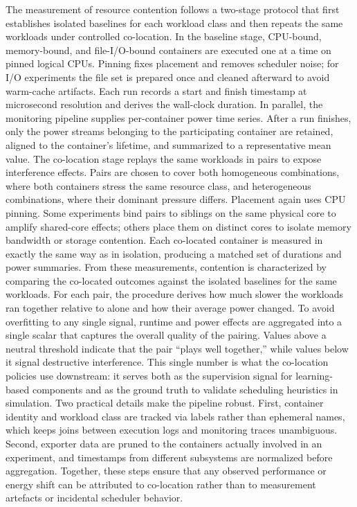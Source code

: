 The measurement of resource contention follows a two-stage protocol that first establishes isolated baselines for each workload class and then repeats the same workloads under controlled co-location. In the baseline stage, CPU-bound, memory-bound, and file-I/O-bound containers are executed one at a time on pinned logical CPUs. Pinning fixes placement and removes scheduler noise; for I/O experiments the file set is prepared once and cleaned afterward to avoid warm-cache artifacts. Each run records a start and finish timestamp at microsecond resolution and derives the wall-clock duration. In parallel, the monitoring pipeline supplies per-container power time series. After a run finishes, only the power streams belonging to the participating container are retained, aligned to the container’s lifetime, and summarized to a representative mean value.
The co-location stage replays the same workloads in pairs to expose interference effects. Pairs are chosen to cover both homogeneous combinations, where both containers stress the same resource class, and heterogeneous combinations, where their dominant pressure differs. Placement again uses CPU pinning. Some experiments bind pairs to siblings on the same physical core to amplify shared-core effects; others place them on distinct cores to isolate memory bandwidth or storage contention. Each co-located container is measured in exactly the same way as in isolation, producing a matched set of durations and power summaries.
From these measurements, contention is characterized by comparing the co-located outcomes against the isolated baselines for the same workloads. For each pair, the procedure derives how much slower the workloads ran together relative to alone and how their average power changed. To avoid overfitting to any single signal, runtime and power effects are aggregated into a single scalar that captures the overall quality of the pairing. Values above a neutral threshold indicate that the pair “plays well together,” while values below it signal destructive interference. This single number is what the co-location policies use downstream: it serves both as the supervision signal for learning-based components and as the ground truth to validate scheduling heuristics in simulation.
Two practical details make the pipeline robust. First, container identity and workload class are tracked via labels rather than ephemeral names, which keeps joins between execution logs and monitoring traces unambiguous. Second, exporter data are pruned to the containers actually involved in an experiment, and timestamps from different subsystems are normalized before aggregation. Together, these steps ensure that any observed performance or energy shift can be attributed to co-location rather than to measurement artefacts or incidental scheduler behavior.
